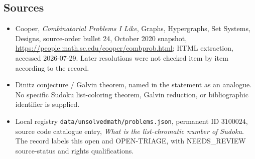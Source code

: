 \documentclass[11pt]{article}
\begin{document}
\subsection{Sources}
\begin{itemize}
\item Cooper, \emph{Combinatorial Problems I Like}, Graphs, Hypergraphs, Set Systems, Designs, source-order bullet 24, October 2020 snapshot, \url{https://people.math.sc.edu/cooper/combprob.html}; HTML extraction, accessed 2026-07-29. Later resolutions were not checked item by item according to the record.
\item Dinitz conjecture / Galvin theorem, named in the statement as an analogue. No specific Sudoku list-coloring theorem, Galvin reduction, or bibliographic identifier is supplied.
\item Local registry \texttt{data/unsolvedmath/problems.json}, permanent ID $3100024$, source code catalogue entry, \emph{What is the list-chromatic number of Sudoku}. The record labels this open and OPEN-TRIAGE, with NEEDS\_REVIEW source-status and rights qualifications.
\end{itemize}
\end{document}
